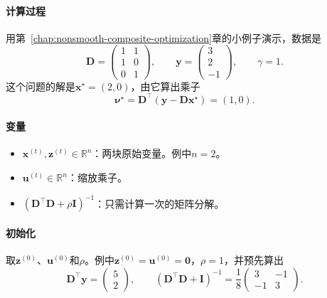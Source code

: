 \paragraph{计算过程}
用第~\ref{chap:nonsmooth-composite-optimization}章的小例子演示，数据是
\[
 \bm{D}=\begin{pmatrix}1&1\\1&0\\0&1\end{pmatrix},\qquad
 \bm{y}=\begin{pmatrix}3\\2\\-1\end{pmatrix},\qquad
 \gamma=1 .
\]
这个问题的解是$\bm{x}^\star=(2,0)$，由它算出乘子
\[
 \bm{\nu}^\star=\bm{D}^\top(\bm{y}-\bm{D}\bm{x}^\star)=(1,0).
\]

\paragraph{变量}
\begin{itemize}
 \item $\bm{x}^{(t)},\bm{z}^{(t)}\in\mathbb{R}^n$：两块原始变量。例中$n=2$。
 \item $\bm{u}^{(t)}\in\mathbb{R}^n$：缩放乘子。
 \item $(\bm{D}^\top\bm{D}+\rho\bm{I})^{-1}$：只需计算一次的矩阵分解。
\end{itemize}

\paragraph{初始化}
取$\bm{z}^{(0)}$、$\bm{u}^{(0)}$和$\rho$。例中$\bm{z}^{(0)}=\bm{u}^{(0)}=\bm{0}$，$\rho=1$，并预先算出
\[
 \bm{D}^\top\bm{y}=\begin{pmatrix}5\\2\end{pmatrix},\qquad
 (\bm{D}^\top\bm{D}+\bm{I})^{-1}=\frac18\begin{pmatrix}3&-1\\-1&3\end{pmatrix}.
\]

